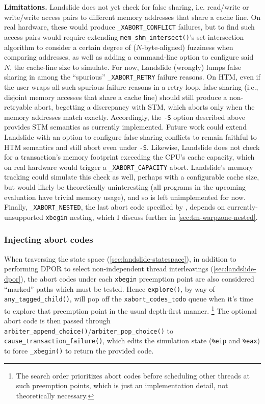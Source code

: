 {\bf Limitations.}
Landslide does not yet check for false sharing,
i.e. read/write or write/\allowbreak{}write access pairs to different memory addresses that share a cache line.
On real hardware, these would produce {\tt \_XABORT\_CONFLICT} failures,
but to find such access pairs would require extending {\tt mem\_shm\_intersect()}'s set intersection algorithm
to consider a certain degree of ($N$-byte-aligned) fuzziness when comparing addresses,
as well as adding a command-line option to configure said $N$, the cache-line size to simulate.
For now, Landslide (wrongly) lumps false sharing in among the ``spurious'' {\tt \_XABORT\_RETRY} failure reasons.
%
On HTM, even if the user wraps all such spurious failure reasons in a retry loop,
false sharing (i.e., disjoint memory accesses that share a cache line)
should still produce a non-retryable abort,
begetting a discrepancy with STM,
which aborts only when the memory addresses match exactly.
Accordingly, the {\tt -S} option described above provides STM semantics as currently implemented.
Future work could extend Landslide with an option to configure false sharing conflicts
to remain faithful to HTM semantics and still abort even under {\tt -S}.
%
Likewise, Landslide does not check for a transaction's memory footprint exceeding the CPU's cache capacity,
which on real hardware would trigger a {\tt \_XABORT\_CAPACITY} abort.
Landslide's memory tracking could simulate this check as well,
perhaps with a configurable cache size,
but would likely be theoretically uninteresting
(all programs in the upcoming evaluation have trivial memory usage),
and so is left unimplemented for now.
%
Finally,
{\tt \_XABORT\_NESTED},
the last abort code specified by \cite{htm-gcc},
depends on currently-unsupported {\tt xbegin} nesting, which I discuss further in
\cref{sec:tm-warpzone-nested}.

\subsubsection{Injecting abort codes}
When traversing the state space (\cref{sec:landslide-statespace}),
in addition to performing DPOR to select non-independent thread interleavings (\cref{sec:landslide-dpor}),
the abort codes under each {\tt xbegin} preemption point are also considered ``marked'' paths which must be tested.
Hence {\tt explore()}, by way of {\tt any\_tagged\_child()},
will pop off the {\tt xabort\_codes\_todo} queue
when it's time to explore that preemption point in the usual depth-first manner.%
\footnote{The search order prioritizes abort codes before scheduling other threads
at such preemption points,
which is just an implementation detail, not theoretically necessary.}
The optional abort code is then passed through {\tt arbiter\_append\_choice()}/{\tt arbiter\_pop\_choice()}
to {\tt cause\_transaction\_failure()},
which edits the simulation state ({\tt \%eip} and {\tt \%eax})
to force {\tt \_xbegin()} to return the provided code.

